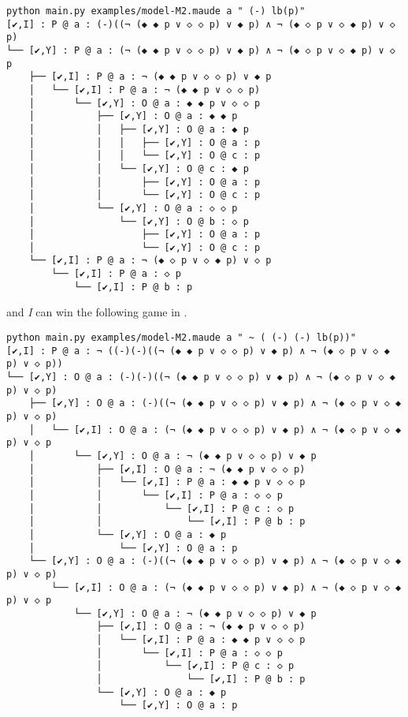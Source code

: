 \documentclass{easychair}
\newcommand{\I}{\emph{I}\xspace}
\begin{document}
\begin{Verbatim}[fontsize=\scriptsize]
python main.py examples/model-M2.maude a " (-) lb(p)"
[✔,I] : P @ a : (-)((¬ (◆ ◆ p ∨ ◇ ◇ p) ∨ ◆ p) ∧ ¬ (◆ ◇ p ∨ ◇ ◆ p) ∨ ◇ p)
└── [✔,Y] : P @ a : (¬ (◆ ◆ p ∨ ◇ ◇ p) ∨ ◆ p) ∧ ¬ (◆ ◇ p ∨ ◇ ◆ p) ∨ ◇ p
    ├── [✔,I] : P @ a : ¬ (◆ ◆ p ∨ ◇ ◇ p) ∨ ◆ p
    │   └── [✔,I] : P @ a : ¬ (◆ ◆ p ∨ ◇ ◇ p)
    │       └── [✔,Y] : O @ a : ◆ ◆ p ∨ ◇ ◇ p
    │           ├── [✔,Y] : O @ a : ◆ ◆ p
    │           │   ├── [✔,Y] : O @ a : ◆ p
    │           │   │   ├── [✔,Y] : O @ a : p
    │           │   │   └── [✔,Y] : O @ c : p
    │           │   └── [✔,Y] : O @ c : ◆ p
    │           │       ├── [✔,Y] : O @ a : p
    │           │       └── [✔,Y] : O @ c : p
    │           └── [✔,Y] : O @ a : ◇ ◇ p
    │               └── [✔,Y] : O @ b : ◇ p
    │                   ├── [✔,Y] : O @ a : p
    │                   └── [✔,Y] : O @ c : p
    └── [✔,I] : P @ a : ¬ (◆ ◇ p ∨ ◇ ◆ p) ∨ ◇ p
        └── [✔,I] : P @ a : ◇ p
            └── [✔,I] : P @ b : p
\end{Verbatim}

and \I can win the following game in . 


\begin{Verbatim}[fontsize=\scriptsize]
python main.py examples/model-M2.maude a " ~ ( (-) (-) lb(p))"
[✔,I] : P @ a : ¬ ((-)(-)((¬ (◆ ◆ p ∨ ◇ ◇ p) ∨ ◆ p) ∧ ¬ (◆ ◇ p ∨ ◇ ◆ p) ∨ ◇ p))
└── [✔,Y] : O @ a : (-)(-)((¬ (◆ ◆ p ∨ ◇ ◇ p) ∨ ◆ p) ∧ ¬ (◆ ◇ p ∨ ◇ ◆ p) ∨ ◇ p)
    ├── [✔,Y] : O @ a : (-)((¬ (◆ ◆ p ∨ ◇ ◇ p) ∨ ◆ p) ∧ ¬ (◆ ◇ p ∨ ◇ ◆ p) ∨ ◇ p)
    │   └── [✔,I] : O @ a : (¬ (◆ ◆ p ∨ ◇ ◇ p) ∨ ◆ p) ∧ ¬ (◆ ◇ p ∨ ◇ ◆ p) ∨ ◇ p
    │       └── [✔,Y] : O @ a : ¬ (◆ ◆ p ∨ ◇ ◇ p) ∨ ◆ p
    │           ├── [✔,I] : O @ a : ¬ (◆ ◆ p ∨ ◇ ◇ p)
    │           │   └── [✔,I] : P @ a : ◆ ◆ p ∨ ◇ ◇ p
    │           │       └── [✔,I] : P @ a : ◇ ◇ p
    │           │           └── [✔,I] : P @ c : ◇ p
    │           │               └── [✔,I] : P @ b : p
    │           └── [✔,Y] : O @ a : ◆ p
    │               └── [✔,Y] : O @ a : p
    └── [✔,Y] : O @ a : (-)((¬ (◆ ◆ p ∨ ◇ ◇ p) ∨ ◆ p) ∧ ¬ (◆ ◇ p ∨ ◇ ◆ p) ∨ ◇ p)
        └── [✔,I] : O @ a : (¬ (◆ ◆ p ∨ ◇ ◇ p) ∨ ◆ p) ∧ ¬ (◆ ◇ p ∨ ◇ ◆ p) ∨ ◇ p
            └── [✔,Y] : O @ a : ¬ (◆ ◆ p ∨ ◇ ◇ p) ∨ ◆ p
                ├── [✔,I] : O @ a : ¬ (◆ ◆ p ∨ ◇ ◇ p)
                │   └── [✔,I] : P @ a : ◆ ◆ p ∨ ◇ ◇ p
                │       └── [✔,I] : P @ a : ◇ ◇ p
                │           └── [✔,I] : P @ c : ◇ p
                │               └── [✔,I] : P @ b : p
                └── [✔,Y] : O @ a : ◆ p
                    └── [✔,Y] : O @ a : p
\end{Verbatim}
\end{document}
